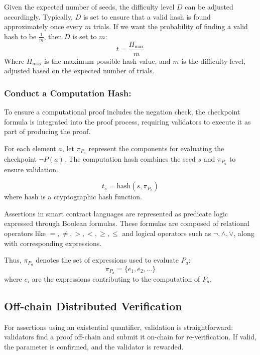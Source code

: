 \documentclass[runningheads]{llncs}
\begin{document}
Given the expected number of seeds, the difficulty level \( D \) can be adjusted accordingly. Typically, \( D \) is set to ensure that a valid hash is found approximately once every \( m \) trials. If we want the probability of finding a valid hash to be \( \frac{1}{m} \), then \( D \) is set to \( m \):
\begin{equation}
\label{eq:13}
t = \frac{H_{\text{max}}}{m}
\end{equation}
Where \( H_{\text{max}} \) is the maximum possible hash value, and \( m \) is the difficulty level, adjusted based on the expected number of trials.
\subsubsection{Conduct a Computation Hash:} To ensure a computational proof includes the negation check, the checkpoint formula is integrated into the proof process, requiring validators to execute it as part of producing the proof.

For each element \( a \), let \(\pi_{P_{a}}\) represent the components for evaluating the checkpoint \(\neg P(a)\). The computation hash combines the seed \( s \) and \(\pi_{P_{a}}\) to ensure validation.

\begin{equation}
\label{eq:14}
t_s = \text{hash}(s, \pi_{P_{a}})
\end{equation}
where \(\text{hash}\) is a cryptographic hash function.

Assertions in smart contract languages are represented as predicate logic expressed through Boolean formulas. These formulas are composed of relational operators like \( =, \neq, >, <, \geq, \leq \) and logical operators such as \( \neg, \land, \lor \), along with corresponding expressions.

Thus, \(\pi_{P_{a}}\) denotes the set of expressions used to evaluate \(P_a\):
\begin{equation*}
\pi_{P_{a}} = \{ e_1, e_2, \ldots \}
\end{equation*}
where \(e_i\) are the expressions contributing to the computation of \(P_a\).
\subsection{Off-chain Distributed Verification}
For assertions using an existential quantifier, validation is straightforward: validators find a proof off-chain and submit it on-chain for re-verification. If valid, the parameter is confirmed, and the validator is rewarded.
\end{document}
